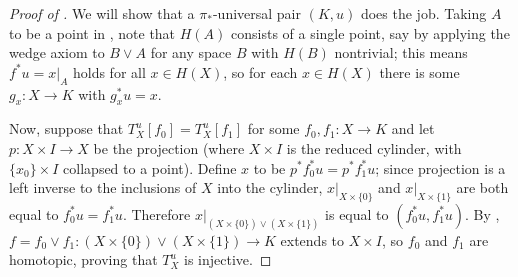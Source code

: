\documentclass[10pt]{article}
\begin{document}
\begin{proof}
    [Proof of ]
    \label{pf:brown-representability}
    We will show that a $\pi_*$-universal pair $(K,u)$ does the job.
    Taking $A$ to be a point in ,
    note that $H(A)$ consists of a single point,
    say by applying the wedge axiom to $B\vee A$
    for any space $B$ with $H(B)$ nontrivial;
    this means $f^*u = x|_A$ holds for all $x\in H(X)$,
    so for each $x\in H(X)$ there is some $g_x\colon X\to K$
    with $g_x^*u = x$.

    Now, suppose that $T^u_X[f_0] = T^u_X[f_1]$
    for some $f_0,f_1\colon X\to K$ and let $p\colon X\times I\to X$
    be the projection (where $X\times I$ is the reduced cylinder,
    with $\{x_0\}\times I$ collapsed to a point).
    Define $x$ to be $p^*f_0^*u = p^*f_1^*u$;
    since projection is a left inverse to the inclusions
    of $X$ into the cylinder, $x|_{X\times\{0\}}$ and $x|_{X\times\{1\}}$
    are both equal to $f_0^*u = f_1^*u$.
    Therefore $x|_{(X\times\{0\})\vee(X\times\{1\})}$
    is equal to $(f_0^*u, f_1^*u)$. By
    ,
    $f = f_0\vee f_1\colon (X\times\{0\})\vee (X\times\{1\})\to K$
    extends to $X\times I$, so $f_0$ and $f_1$ are homotopic,
    proving that $T^u_X$ is injective.
\end{proof}
\end{document}
